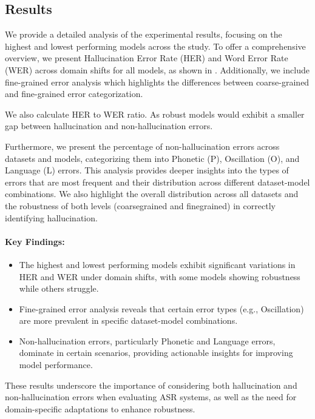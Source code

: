 \subsection{Results}\label{appsubsec:results}

We provide a detailed analysis of the experimental results, focusing on the highest and lowest performing models across the study. To offer a comprehensive overview, we present Hallucination Error Rate (HER) and Word Error Rate (WER) across domain shifts for all models, as shown in . Additionally, we include fine-grained error analysis which highlights the differences between coarse-grained and fine-grained error categorization.


We also calculate HER to WER ratio. As robust models would exhibit a smaller gap between hallucination and non-hallucination errors. 




Furthermore, we present the percentage of non-hallucination errors across datasets and models, categorizing them into Phonetic (P), Oscillation (O), and Language (L) errors. This analysis provides deeper insights into the types of errors that are most frequent and their distribution across different dataset-model combinations.  
We also highlight the overall distribution across all datasets and the robustness of both levels (coarsegrained and finegrained) in correctly identifying hallucination.
\paragraph{Key Findings:}
\begin{itemize}
    \item The highest and lowest performing models exhibit significant variations in HER and WER under domain shifts, with some models showing robustness while others struggle.
    \item Fine-grained error analysis reveals that certain error types (e.g., Oscillation) are more prevalent in specific dataset-model combinations.
    \item Non-hallucination errors, particularly Phonetic and Language errors, dominate in certain scenarios, providing actionable insights for improving model performance.
\end{itemize}

These results underscore the importance of considering both hallucination and non-hallucination errors when evaluating ASR systems, as well as the need for domain-specific adaptations to enhance robustness.


